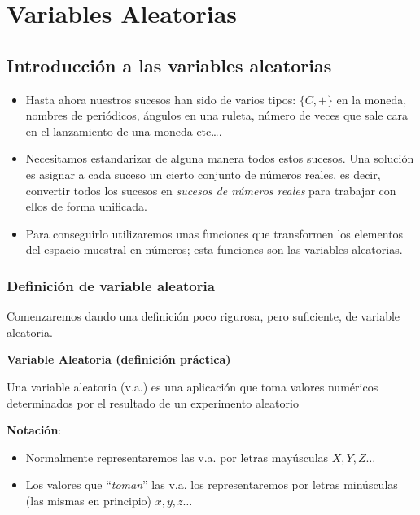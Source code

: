 \documentclass[]{book}
\providecommand{\tightlist}{%
  \setlength{\itemsep}{0pt}\setlength{\parskip}{0pt}}
\begin{document}
\hypertarget{variables-aleatorias}{%
\chapter{Variables Aleatorias}\label{variables-aleatorias}}

\hypertarget{introducciuxf3n-a-las-variables-aleatorias}{%
\section{Introducción a las variables aleatorias}\label{introducciuxf3n-a-las-variables-aleatorias}}

\begin{itemize}
\tightlist
\item
  Hasta ahora nuestros sucesos han sido de varios tipos: \(\{C,+\}\) en
  la moneda, nombres de periódicos, ángulos en una ruleta, número de
  veces que sale cara en el lanzamiento de una moneda etc\ldots.
\item
  Necesitamos estandarizar de alguna manera todos estos sucesos. Una
  solución es asignar a cada suceso un cierto conjunto de
  números reales, es decir, convertir todos los sucesos en
  \emph{sucesos de números reales} para trabajar con ellos de forma
  unificada.
\item
  Para conseguirlo utilizaremos unas funciones que
  transformen los elementos del espacio muestral en números; esta funciones son las
  variables aleatorias.
\end{itemize}

\hypertarget{definiciuxf3n-de-variable-aleatoria}{%
\subsection{Definición de variable aleatoria}\label{definiciuxf3n-de-variable-aleatoria}}

Comenzaremos dando una definición poco rigurosa, pero suficiente, de variable aleatoria.

\textbf{Variable Aleatoria (definición práctica)}

Una variable aleatoria (v.a.) es una aplicación que toma valores numéricos determinados por el resultado de un experimento aleatorio

\textbf{Notación}:

\begin{itemize}
\tightlist
\item
  Normalmente representaremos las v.a. por letras mayúsculas \(X,Y,Z\ldots\)
\item
  Los valores que ``\emph{toman}'' las v.a. los representaremos por letras minúsculas (las mismas en principio) \(x,y,z\ldots\)
\end{itemize}
\end{document}
